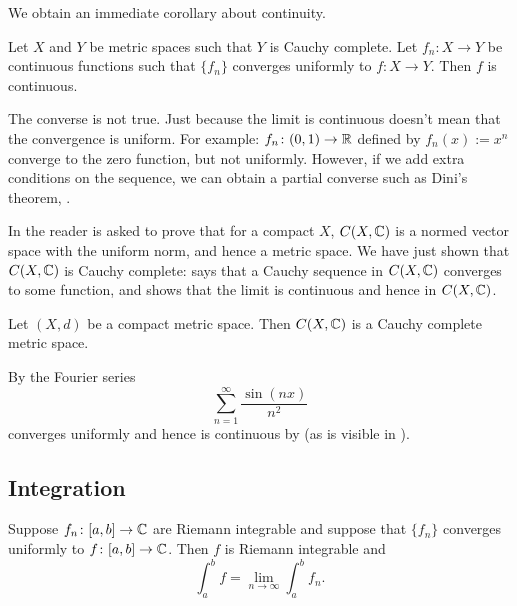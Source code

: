 We obtain an immediate corollary about continuity.

\begin{cor} \label{cor:metricuniformcontinuous}
Let $X$ and $Y$ be metric spaces such that $Y$ is Cauchy complete.
Let $f_n \colon X \to Y$ be continuous functions
such that
$\{ f_n \}$ converges uniformly to $f \colon X \to Y$.  
Then $f$ is continuous.
\end{cor}

The converse is not true.  Just because the limit is continuous doesn't mean
that the convergence is uniform.  For example:
$f_n \colon (0,1) \to {\mathbb{R}}$ defined by $f_n(x) := x^n$ converge to
the zero function, but not uniformly.  However, if we add extra conditions
on the sequence, we can obtain a partial converse such as Dini's theorem,
.

In  the reader is asked to prove
that for a compact $X$, $C(X,{\mathbb{C}})$ is a normed vector space
with the uniform norm, and hence a metric space.  We have just shown that
$C(X,{\mathbb{C}})$ is Cauchy complete:   says that a Cauchy
sequence in $C(X,{\mathbb{C}})$ converges to some function,
and  shows that the limit is
continuous and hence in $C(X,{\mathbb{C}})$.

\begin{cor}
Let $(X,d)$ be a compact metric space.
Then $C(X,{\mathbb{C}})$ is a Cauchy complete metric space.
\end{cor}

\begin{example}
By 
the Fourier series 
\begin{equation*}
\sum_{n=1}^\infty \frac{\sin(nx)}{n^2}
\end{equation*}
converges uniformly and hence is continuous by  (as is visible
in ).
\end{example}

\subsection{Integration}

\begin{prop} \label{prop:complexlimitswapintegral}
Suppose $f_n \colon [a,b] \to {\mathbb{C}}$
are Riemann integrable and suppose that $\{ f_n \}$ converges
uniformly to $f \colon [a,b] \to {\mathbb{C}}$.  Then $f$ is Riemann integrable
and
\begin{equation*}
\int_a^b f = \lim_{n\to \infty} \int_a^b f_n .
\end{equation*}
\end{prop}

